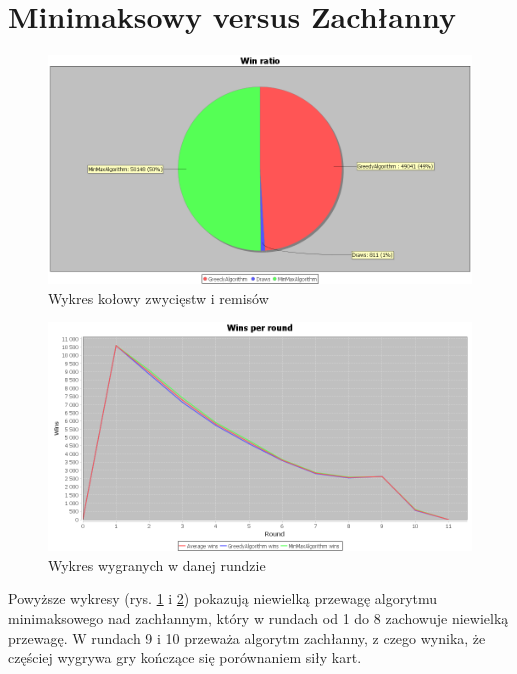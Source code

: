 \section{Minimaksowy versus Zachłanny}
\begin{figure}[H]
	\centering
	\includegraphics[width=\textwidth]{Resources/MirrorMmVsG/GVsMmWin.PNG}
	\caption{Wykres kołowy zwycięstw i remisów} 
	\label{fig:MirrorGVsMmWin}
\end{figure}

\begin{figure}[H]
	\centering
	\includegraphics[width=\textwidth]{Resources/MirrorMmVsG/GVsMmRoundWin.PNG}
	\caption{Wykres wygranych w danej rundzie} 
	\label{fig:MirrorGVsMmRoundWin}
\end{figure}

Powyższe wykresy (rys. \ref{fig:MirrorGVsMmWin} i \ref{fig:MirrorGVsMmRoundWin}) pokazują niewielką przewagę algorytmu minimaksowego nad zachłannym, który w rundach od 1 do 8 zachowuje niewielką przewagę. W rundach 9 i 10 przeważa algorytm zachłanny, z czego wynika, że częściej wygrywa gry kończące się porównaniem siły kart.

